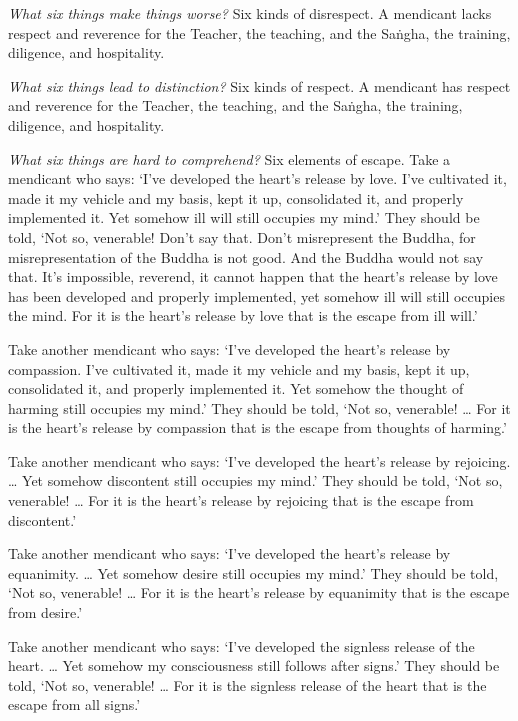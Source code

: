\documentclass[12pt,openany]{book}%
\begin{document}
\emph{What six things make things worse?} Six kinds of disrespect. A mendicant lacks respect and reverence for the Teacher, the teaching, and the \textsanskrit{Saṅgha}, the training, diligence, and hospitality. 

\emph{What six things lead to distinction?} Six kinds of respect. A mendicant has respect and reverence for the Teacher, the teaching, and the \textsanskrit{Saṅgha}, the training, diligence, and hospitality. 

\emph{What six things are hard to comprehend?} Six elements of escape. Take a mendicant who says: ‘I’ve developed the heart’s release by love. I’ve cultivated it, made it my vehicle and my basis, kept it up, consolidated it, and properly implemented it. Yet somehow ill will still occupies my mind.’ They should be told, ‘Not so, venerable! Don’t say that. Don’t misrepresent the Buddha, for misrepresentation of the Buddha is not good. And the Buddha would not say that. It’s impossible, reverend, it cannot happen that the heart’s release by love has been developed and properly implemented, yet somehow ill will still occupies the mind. For it is the heart’s release by love that is the escape from ill will.’ 

Take another mendicant who says: ‘I’ve developed the heart’s release by compassion. I’ve cultivated it, made it my vehicle and my basis, kept it up, consolidated it, and properly implemented it. Yet somehow the thought of harming still occupies my mind.’ They should be told, ‘Not so, venerable! … For it is the heart’s release by compassion that is the escape from thoughts of harming.’ 

Take another mendicant who says: ‘I’ve developed the heart’s release by rejoicing. … Yet somehow discontent still occupies my mind.’ They should be told, ‘Not so, venerable! … For it is the heart’s release by rejoicing that is the escape from discontent.’ 

Take another mendicant who says: ‘I’ve developed the heart’s release by equanimity. … Yet somehow desire still occupies my mind.’ They should be told, ‘Not so, venerable! … For it is the heart’s release by equanimity that is the escape from desire.’ 

Take another mendicant who says: ‘I’ve developed the signless release of the heart. … Yet somehow my consciousness still follows after signs.’ They should be told, ‘Not so, venerable! … For it is the signless release of the heart that is the escape from all signs.’ 
\end{document}
